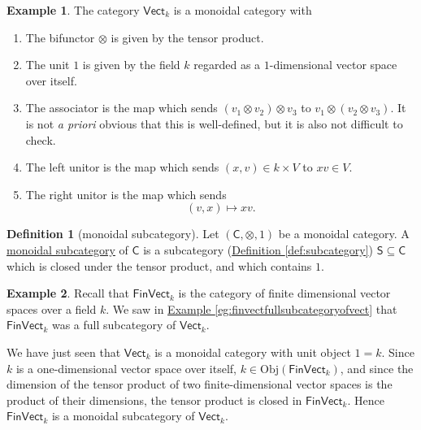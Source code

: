 \documentclass[a4paper,10pt]{scrreprt}
\newcommand{\defn}[1]{\ul{#1}}
\newcommand{\Obj}{\mathrm{Obj}}
\theoremstyle{definition}
\newtheorem{definition}{Definition}[section]
\newtheorem{example}{Example}[section]
\theoremstyle{plain}
\theoremstyle{remark}
\begin{document}
\begin{example}
  \label{eg:vectisamonoidalcategory}
  The category $\mathsf{Vect}_{k}$ is a monoidal category with
  \begin{enumerate}
    \item The bifunctor $\otimes$ is given by the tensor product.

    \item The unit $1$ is given by the field $k$ regarded as a $1$-dimensional vector space over itself.

    \item The associator is the map which sends $(v_{1} \otimes v_{2}) \otimes v_{3}$ to $v_{1} \otimes (v_{2} \otimes v_{3})$. It is not \emph{a priori} obvious that this is well-defined, but it is also not difficult to check.

    \item The left unitor is the map which sends $(x, v) \in k \times V$
      to $xv \in V$.

    \item The right unitor is the map which sends 
      \begin{equation*}
        (v, x) \mapsto xv.
      \end{equation*}
  \end{enumerate}
\end{example}

\begin{definition}[monoidal subcategory]
  \label{def:monoidalsubcategory}
  Let $(\mathsf{C}, \otimes, 1)$ be a monoidal category. A \defn{monoidal subcategory} of $\mathsf{C}$ is a subcategory (\hyperref[def:subcategory]{Definition \ref*{def:subcategory}}) $\mathsf{S} \subseteq \mathsf{C}$ which is closed under the tensor product, and which contains $1$.
\end{definition}

\begin{example}
  Recall that $\mathsf{FinVect}_{k}$ is the category of finite dimensional vector spaces over a field $k$. We saw in \hyperref[eg:finvectfullsubcategoryofvect]{Example \ref*{eg:finvectfullsubcategoryofvect}} that $\mathsf{FinVect}_{k}$ was a full subcategory of $\mathsf{Vect}_{k}$.

  We have just seen that $\mathsf{Vect}_{k}$ is a monoidal category with unit object $1 = k$. Since $k$ is a one-dimensional vector space over itself, $k \in \Obj(\mathsf{FinVect}_{k})$, and since the dimension of the tensor product of two finite-dimensional vector spaces is the product of their dimensions, the tensor product is closed in $\mathsf{FinVect}_{k}$. Hence $\mathsf{FinVect}_{k}$ is a monoidal subcategory of $\mathsf{Vect}_{k}$.
\end{example}
\end{document}
